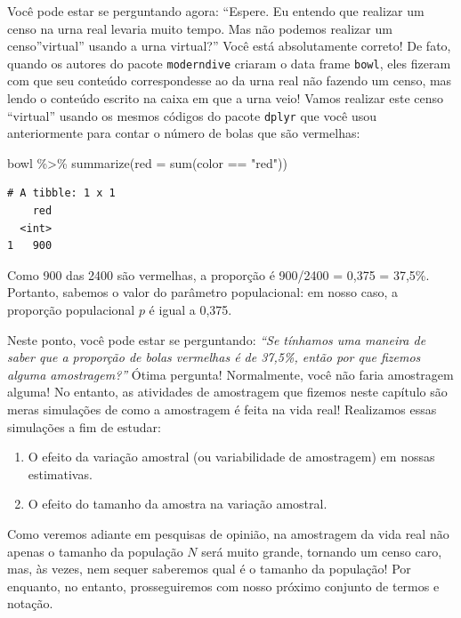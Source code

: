 \documentclass[
  letterpaper,
  DIV=11,
  numbers=noendperiod]{scrreprt}
\newenvironment{Shaded}{\begin{snugshade}}{\end{snugshade}}
\newcommand{\AttributeTok}[1]{\textcolor[rgb]{0.40,0.45,0.13}{#1}}
\newcommand{\FunctionTok}[1]{\textcolor[rgb]{0.28,0.35,0.67}{#1}}
\newcommand{\NormalTok}[1]{\textcolor[rgb]{0.00,0.23,0.31}{#1}}
\newcommand{\SpecialCharTok}[1]{\textcolor[rgb]{0.37,0.37,0.37}{#1}}
\newcommand{\StringTok}[1]{\textcolor[rgb]{0.13,0.47,0.30}{#1}}
\begin{document}
Você pode estar se perguntando agora: ``Espere. Eu entendo que realizar
um censo na urna real levaria muito tempo. Mas não podemos realizar um
censo''virtual'' usando a urna virtual?'' Você está absolutamente
correto! De fato, quando os autores do pacote \texttt{moderndive}
criaram o data frame \texttt{bowl}, eles fizeram com que seu conteúdo
correspondesse ao da urna real não fazendo um censo, mas lendo o
conteúdo escrito na caixa em que a urna veio! Vamos realizar este censo
``virtual'' usando os mesmos códigos do pacote \texttt{dplyr} que você
usou anteriormente para contar o número de bolas que são vermelhas:

\begin{Shaded}
\begin{Highlighting}[]
\NormalTok{bowl }\SpecialCharTok{\%\textgreater{}\%}   
  \FunctionTok{summarize}\NormalTok{(}\AttributeTok{red =} \FunctionTok{sum}\NormalTok{(color }\SpecialCharTok{==} \StringTok{"red"}\NormalTok{)) }
\end{Highlighting}
\end{Shaded}

\begin{verbatim}
# A tibble: 1 x 1
    red
  <int>
1   900
\end{verbatim}

Como 900 das 2400 são vermelhas, a proporção é 900/2400 = 0,375 =
37,5\%. Portanto, sabemos o valor do parâmetro populacional: em nosso
caso, a proporção populacional \(p\) é igual a 0,375.

Neste ponto, você pode estar se perguntando: \emph{``Se tínhamos uma
maneira de saber que a proporção de bolas vermelhas é de 37,5\%, então
por que fizemos alguma amostragem?''} Ótima pergunta! Normalmente, você
não faria amostragem alguma! No entanto, as atividades de amostragem que
fizemos neste capítulo são meras simulações de como a amostragem é feita
na vida real! Realizamos essas simulações a fim de estudar:

\begin{enumerate}
\def\labelenumi{\arabic{enumi}.}
\item
  O efeito da variação amostral (ou variabilidade de amostragem) em
  nossas estimativas.
\item
  O efeito do tamanho da amostra na variação amostral.
\end{enumerate}

Como veremos adiante em pesquisas de opinião, na amostragem da vida real
não apenas o tamanho da população \(N\) será muito grande, tornando um
censo caro, mas, às vezes, nem sequer saberemos qual é o tamanho da
população! Por enquanto, no entanto, prosseguiremos com nosso próximo
conjunto de termos e notação.
\end{document}

